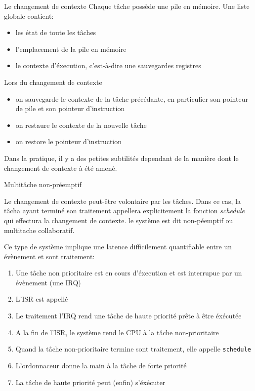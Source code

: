 \begin{frame}{Le changement de contexte}
  Chaque tâche possède une pile en mémoire. Une liste globale contient:
  \begin{itemize} 
  \item les état de toute les tâches
  \item l'emplacement de la pile en mémoire
  \item le contexte d'éxecution, c'est-à-dire une sauvegardes registres
  \end{itemize} 
  Lors du changement de contexte
  \begin{itemize} 
  \item  on  sauvegarde  le   contexte  de  la  tâche  précédante,  en
    particulier son pointeur de pile et son pointeur d'instruction
  \item on restaure le contexte de la nouvelle tâche
  \item on restore le pointeur d'instruction
  \end{itemize} 
  Dans  la pratique, il  y a  des petites  subtilités dependant  de la
  manière dont le changement de contexte à été amené.
\end{frame} 

\begin{frame}{Multitâche non-préemptif}

  Le changement de contexte  peut-être volontaire par les tâches. Dans
  ce   cas,  la   tâcha   ayant  terminé   son  traitement   appellera
  explicitement   la  fonction   \emph{schedule}   qui  effectura   la
  changement  de   contexte.  le  système  est   dit  non-péemptif  ou
  multitache collaboratif.


  Ce type  de système implique une  latence difficilement quantifiable
  entre un évènement et sont traitement:
  \begin{center}
  \end{center}
  \begin{enumerate} 
  \item  Une tâche  non prioritaire  est en  cours d'éxecution  et est
    interrupue par un évènement (une IRQ)
  \item L'ISR est appellé
  \item Le traitement  l'IRQ rend une tâche de  haute priorité prête à
    être éxécutée
  \item  A  la fin  de  l'ISR,  le système  rend  le  CPU  à la  tâche
    non-prioritaire
  \item Quand  la tâche non-prioritaire termine  sont traitement, elle
    appelle \texttt{schedule}
  \item L'ordonnaceur donne la main à la tâche de forte priorité
  \item La tâche de haute priorité peut (enfin) s'éxécuter
  \end{enumerate} 
\end{frame} 

